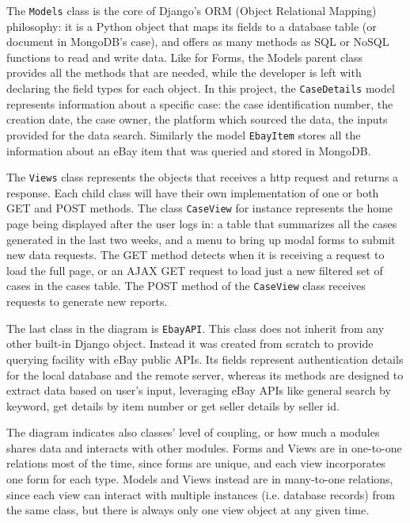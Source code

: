 The \texttt{Models} class is the core of Django's ORM (Object Relational Mapping)
philosophy: it is a Python object that maps its fields to a database table (or
document in MongoDB's case), and offers as many methods as SQL or NoSQL
functions to read and write data. Like for Forms, the Models parent class
provides all the methods that are needed, while the developer is left with
declaring the field types for each object. In this project, the
\texttt{CaseDetails} model represents information about a specific case: the
case identification number, the creation date, the case owner, the platform which
sourced the data, the inputs provided for the data search. Similarly the model
\texttt{EbayItem} stores all the information about an eBay item that was queried
and stored in MongoDB.

The \texttt{Views} class represents the objects that receives a http request and
returns a response. Each child class will have their own implementation of one
or both GET and POST methods. The class \texttt{CaseView} for instance represents the
home page being displayed after the user logs in: a table that summarizes all
the cases generated in the last two weeks, and a menu to bring up modal forms to
submit new data requests. The GET method detects when it is receiving a
request to load the full page, or an AJAX GET request to load just a new
filtered set of cases in the cases table. The POST method of the
\texttt{CaseView} class receives requests to generate new reports.

The last class in the diagram is \texttt{EbayAPI}. This class does not inherit
from any other built-in Django object. Instead it was created from scratch to
provide querying facility with eBay public APIs. Its fields represent
authentication details for the local database and the remote server, whereas its
methods are designed to extract data based on user's input, leveraging eBay
APIs like general search by keyword, get details by item number or get seller
details by seller id.

The diagram indicates also classes' level of coupling, or how much a modules
shares data and interacts with other modules. Forms and Views are in one-to-one
relations most of the time, since forms are unique, and each view incorporates
one form for each type. Models and Views instead are in many-to-one relations,
since each view can interact with multiple instances (i.e. database records)
from the same class, but there is always only one view object at any given time.

